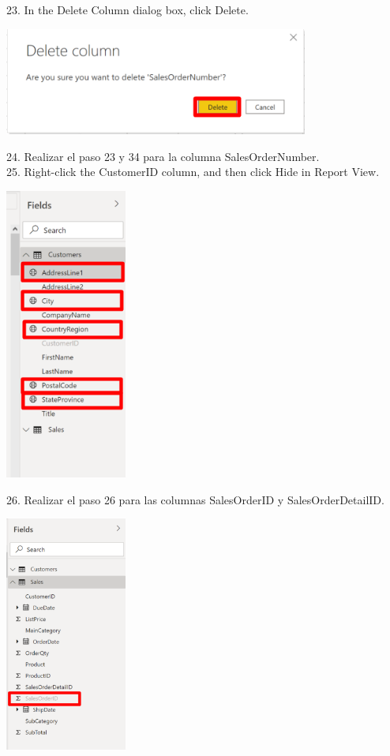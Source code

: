 \documentclass[12pt,letterpaper]{article}
\begin{document}
23. In the Delete Column dialog box, click Delete.
\begin{center}
    \includegraphics[width=10cm]{img/33.png} 
    \vspace{1cm} 
\end{center}
24. Realizar el paso 23 y 34 para la columna SalesOrderNumber.
\\25. Right-click the CustomerID column, and then click Hide in Report View.
\begin{center}
    \includegraphics[width=4cm]{img/30.png}  
    \vspace{2cm} 
\end{center}
26. Realizar el paso 26 para las columnas SalesOrderID y SalesOrderDetailID.
\begin{center}
    \includegraphics[width=4cm]{img/34.png}  
    \vspace{2cm} 
\end{center}
\end{document}
